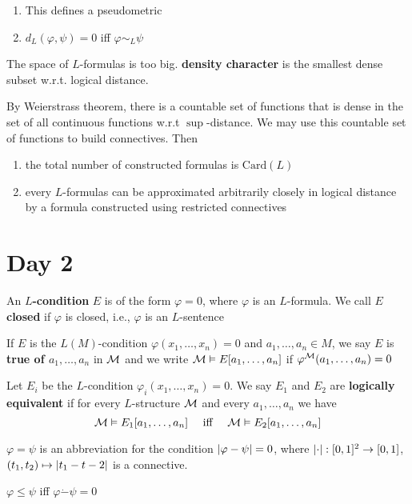 \documentclass[11pt]{article}
\def \Card {\text{Card}}
\begin{document}
\begin{remark}
\begin{enumerate}
\item This defines a pseudometric
\item \(d_L(\varphi,\psi)=0\) iff \(\varphi\sim_L\psi\)
\end{enumerate}
\end{remark}

The space of \(L\)-formulas is too big. \textbf{density character} is the smallest dense subset w.r.t.
logical distance.

By Weierstrass theorem, there is a countable set of functions that is dense in the set of all
continuous functions w.r.t \(\sup\)-distance. We may use this countable set of functions to build
connectives. Then
\begin{enumerate}
\item the total number of constructed formulas is \(\Card(L)\)
\item every \(L\)-formulas can be approximated arbitrarily closely in logical distance by a formula
constructed using restricted connectives
\end{enumerate}
\section{Day 2}
\label{sec:org4a69f3a}
\begin{definition}[]
An \textbf{\(L\)-condition} \(E\) is of the form \(\varphi=0\), where \(\varphi\) is an \(L\)-formula. We call \(E\)
\textbf{closed} if \(\varphi\) is closed, i.e., \(\varphi\) is an \(L\)-sentence

If \(E\) is the \(L(M)\)-condition \(\varphi(x_1,\dots,x_n)=0\) and \(a_1,\dots,a_n\in M\), we say \(E\)
is \textbf{true of \(a_1,\dots,a_n\)} in \(\mathcal{M}\) and we write \(\mathcal{M}\vDash E[a_1,\dots,a_n]\) if
\(\varphi^{\mathcal{M}}(a_1,\dots,a_n)=0\)

Let \(E_i\) be the \(L\)-condition \(\varphi_i(x_1,\dots,x_n)=0\). We say \(E_1\) and \(E_2\) are
\textbf{logically equivalent} if for every \(L\)-structure \(\mathcal{M}\) and every \(a_1,\dots,a_n\) we have
\begin{equation*}
  \mathcal{M}\vDash E_1[a_1,\dots,a_n] \quad\text{ iff }\quad
  \mathcal{M}\vDash E_2[a_1,\dots,a_n]
\end{equation*}

\(\varphi=\psi\) is an abbreviation for the condition \(\abs{\varphi-\psi}=0\), where
\(\abs{\cdot}:[0,1]^2\to[0,1]\), \((t_1,t_2)\mapsto\abs{t_1-t-2}\) is a connective.

\(\varphi\le\psi\) iff \(\varphi\dot-\psi=0\)
\end{definition}
\end{document}
